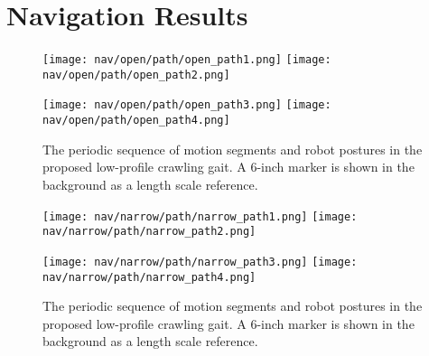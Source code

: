 \chapter{Navigation Results} \label{ch:results_navigation}






\begin{figure}
  \centerline{
    \texttt{[image: nav/open/path/open\_path1.png]}
    \texttt{[image: nav/open/path/open\_path2.png]}
  }
  \vspace*{0.05in}
  \centerline{
    \texttt{[image: nav/open/path/open\_path3.png]}
    \texttt{[image: nav/open/path/open\_path4.png]}
  }
  \caption{The periodic sequence of motion segments and robot postures in the proposed low-profile crawling gait. A 6-inch marker is shown in the background as a length scale reference.}
  \label{fig:nav_open_frames1}
  \vspace*{-0.07in}
\end{figure}

\begin{figure}
  \centerline{
    \texttt{[image: nav/narrow/path/narrow\_path1.png]}
    \texttt{[image: nav/narrow/path/narrow\_path2.png]}
  }
  \vspace*{0.05in}
  \centerline{
    \texttt{[image: nav/narrow/path/narrow\_path3.png]}
    \texttt{[image: nav/narrow/path/narrow\_path4.png]}
  }
    \caption{The periodic sequence of motion segments and robot postures in the proposed low-profile crawling gait. A 6-inch marker is shown in the background as a length scale reference.}
    \label{fig:nav_narrow_frames1}
        \vspace*{-0.07in}
\end{figure}


